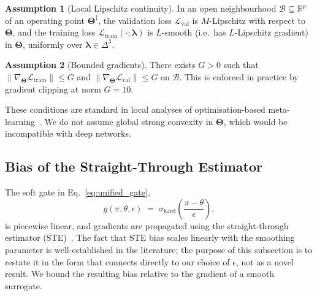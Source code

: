 \documentclass[10pt]{article}
\theoremstyle{plain}
\theoremstyle{definition}
\newtheorem{assumption}{Assumption}
\begin{document}
\begin{assumption}[Local Lipschitz continuity]
\label{assump:lipschitz}
In an open neighbourhood
$\mathcal{B}\subseteq\mathbb{R}^{p}$ of an operating point
$\boldsymbol{\Theta}^{\dagger}$, the validation loss
$\mathcal{L}_{\mathrm{val}}$ is $M$-Lipschitz with respect to
$\boldsymbol{\Theta}$, and the training loss
$\mathcal{L}_{\mathrm{train}}(\cdot;\boldsymbol{\lambda})$ is
$L$-smooth (i.e.\ has $L$-Lipschitz gradient) in
$\boldsymbol{\Theta}$, uniformly over
$\boldsymbol{\lambda}\in\Delta^{3}$.
\end{assumption}

\begin{assumption}[Bounded gradients]
\label{assump:bounded}
There exists $G>0$ such that
$\|\nabla_{\boldsymbol{\Theta}}\mathcal{L}_{\mathrm{train}}\|\le G$
and
$\|\nabla_{\boldsymbol{\Theta}}\mathcal{L}_{\mathrm{val}}\|\le G$
on $\mathcal{B}$. This is enforced in practice by gradient
clipping at norm $G=10$.
\end{assumption}

These conditions are standard in local analyses of
optimisation-based meta-learning~\citep{franceschi2018bilevel,
liu2021investigating}. We do not assume global strong convexity in
$\boldsymbol{\Theta}$, which would be incompatible with deep
networks.

\subsection{Bias of the Straight-Through Estimator}
\label{sec:prop_alpha}

The soft gate in Eq.~\eqref{eq:unified_gate},
\[
g(\pi,\theta,\epsilon) \;=\;
\sigma_{\mathrm{hard}}\!\left(\frac{\pi-\theta}{\epsilon}\right),
\]
is piecewise linear, and gradients are propagated using the
straight-through estimator (STE)~\citep{bengio2013estimating,
louizos2017learning}. The fact that STE bias scales linearly with
the smoothing parameter is well-established in the literature; the
purpose of this subsection is to restate it in the form that
connects directly to our choice of $\epsilon$, not as a novel
result. We bound the resulting bias relative to the
gradient of a smooth surrogate.
\end{document}
